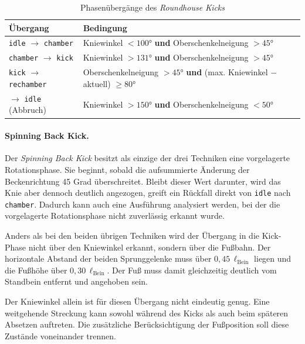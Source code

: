 \documentclass[intern]{cgMA}
\begin{document}
\begin{table}[htbp]
\centering
\begin{tabular}{p{} p{}}
\hline
\textbf{Übergang} & \textbf{Bedingung} \\ \hline
\texttt{idle} $\rightarrow$ \texttt{chamber} & Kniewinkel $<100°$ \textbf{und} Oberschenkelneigung $>45°$ \\
\texttt{chamber} $\rightarrow$ \texttt{kick} & Kniewinkel $>131°$ \textbf{und} Oberschenkelneigung $>45°$ \\
\texttt{kick} $\rightarrow$ \texttt{rechamber} & Oberschenkelneigung $>45°$ \textbf{und} (max. Kniewinkel $-$ aktuell) $\geq80°$ \\
$\rightarrow$ \texttt{idle} (Abbruch) & Kniewinkel $>150°$ \textbf{und} Oberschenkelneigung $<50°$ \\ \hline
\end{tabular}
\caption{Phasenübergänge des \textit{Roundhouse Kicks}}
\label{tab:transitions_round}
\end{table}

\paragraph{Spinning Back Kick.}
Der \textit{Spinning Back Kick} besitzt als einzige der drei Techniken eine vorgelagerte Rotationsphase. Sie beginnt, sobald die aufsummierte Änderung der Beckenrichtung 45 Grad überschreitet. Bleibt dieser Wert darunter, wird das Knie aber dennoch deutlich angezogen, greift ein Rückfall direkt von \texttt{idle} nach \texttt{chamber}. Dadurch kann auch eine Ausführung analysiert werden, bei der die vorgelagerte Rotationsphase nicht zuverlässig erkannt wurde.

Anders als bei den beiden übrigen Techniken wird der Übergang in die Kick-Phase nicht über den Kniewinkel erkannt, sondern über die Fußbahn. Der horizontale Abstand der beiden Sprunggelenke muss über $0{,}45\,\ell_{\text{Bein}}$ liegen und die Fußhöhe über $0{,}30\,\ell_{\text{Bein}}$. Der Fuß muss damit gleichzeitig deutlich vom Standbein entfernt und angehoben sein.

Der Kniewinkel allein ist für diesen Übergang nicht eindeutig genug. Eine weitgehende Streckung kann sowohl während des Kicks als auch beim späteren Absetzen auftreten. Die zusätzliche Berücksichtigung der Fußposition soll diese Zustände voneinander trennen.
\end{document}
